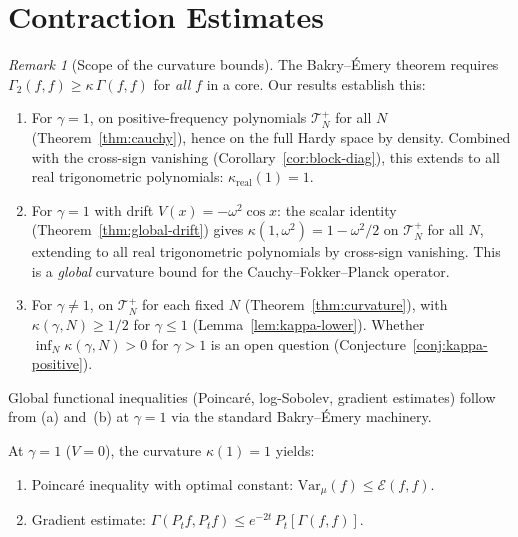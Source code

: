 \documentclass[11pt,a4paper]{article}
\theoremstyle{plain}
\theoremstyle{definition}
\theoremstyle{remark}
\newtheorem{remark}[theorem]{Remark}
\newcommand{\Var}{\mathrm{Var}}
\begin{document}
\section{Contraction Estimates}\label{sec:func-ineq}

\begin{remark}[Scope of the curvature bounds]
\label{rem:scope-curv}
The Bakry--\'Emery theorem requires
$\Gamma_2(f,f) \geq \kappa\,\Gamma(f,f)$ for \emph{all}
$f$ in a core.  Our results establish this:
\begin{enumerate}[label=(\alph*)]
\item For $\gamma = 1$, on positive-frequency polynomials
  $\mathcal{T}_N^+$ for all $N$ (Theorem~\ref{thm:cauchy}),
  hence on the full Hardy space by density.
  Combined with the cross-sign vanishing
  (Corollary~\ref{cor:block-diag}), this extends to
  all real trigonometric polynomials:
  $\kappa_{\mathrm{real}}(1) = 1$.
\item For $\gamma = 1$ with drift $V(x) = -\omega^2\cos x$:
  the scalar identity (Theorem~\ref{thm:global-drift}) gives
  $\kappa(1,\omega^2) = 1 - \omega^2/2$ on $\mathcal{T}_N^+$
  for all $N$, extending to all real trigonometric polynomials
  by cross-sign vanishing.  This is a \emph{global} curvature
  bound for the Cauchy--Fokker--Planck operator.
\item For $\gamma \neq 1$, on $\mathcal{T}_N^+$ for
  each fixed $N$ (Theorem~\ref{thm:curvature}), with
  $\kappa(\gamma,N) \geq 1/2$ for $\gamma \leq 1$
  (Lemma~\ref{lem:kappa-lower}).
  Whether $\inf_N \kappa(\gamma,N) > 0$ for $\gamma > 1$
  is an open question (Conjecture~\ref{conj:kappa-positive}).
\end{enumerate}
Global functional inequalities (Poincar\'e, log-Sobolev,
gradient estimates) follow from (a) and~(b) at $\gamma = 1$
via the standard Bakry--\'Emery machinery.
\end{remark}

At $\gamma = 1$ ($V = 0$), the curvature $\kappa(1) = 1$
yields:
\begin{enumerate}[label=(\roman*)]
\item Poincar\'e inequality with optimal constant:
  $\Var_\mu(f) \leq \mathcal{E}(f,f)$.
\item Gradient estimate:
  $\Gamma(P_t f, P_t f) \leq e^{-2t}\,P_t[\Gamma(f,f)]$.
\end{enumerate}
\end{document}

